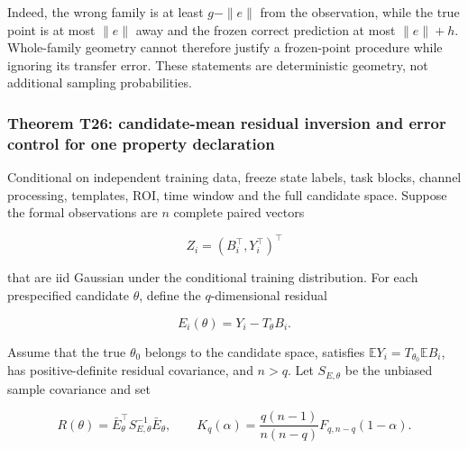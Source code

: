 \documentclass[11pt,a4paper]{article}
\begin{document}
Indeed, the wrong family is at least \(g-\|e\|\) from the observation,
while the true point is at most \(\|e\|\) away and the frozen correct
prediction at most \(\|e\|+h\). Whole-family geometry cannot therefore
justify a frozen-point procedure while ignoring its transfer error.
These statements are deterministic geometry, not additional sampling
probabilities.

\subsubsection{Theorem T26: candidate-mean residual inversion and error
control for one property
declaration}\label{theorem-t26-candidate-mean-residual-inversion-and-error-control-for-one-property-declaration}

\par
\noindent\begin{minipage}{\linewidth}

Conditional on independent training data, freeze state labels, task
blocks, channel processing, templates, ROI, time window and the full
candidate space. Suppose the formal observations are \(n\) complete
paired vectors

\[
Z_i=(B_i^\top,Y_i^\top)^\top
\]

\end{minipage}\par

\par
\noindent\begin{minipage}{\linewidth}

that are iid Gaussian under the conditional training distribution. For
each prespecified candidate \(\theta\), define the \(q\)-dimensional
residual

\[
E_i(\theta)=Y_i-T_\theta B_i.
\]

\end{minipage}\par

\par
\noindent\begin{minipage}{\linewidth}

Assume that the true \(\theta_0\) belongs to the candidate space,
satisfies \(\mathbb E Y_i=T_{\theta_0}\mathbb E B_i\), has
positive-definite residual covariance, and \(n>q\). Let \(S_{E,\theta}\)
be the unbiased sample covariance and set

\[
R(\theta)=\bar E_\theta^\top S_{E,\theta}^{-1}\bar E_\theta,
\qquad
K_q(\alpha)=\frac{q(n-1)}{n(n-q)}F_{q,n-q}(1-\alpha).
\]

\end{minipage}\par
\end{document}
